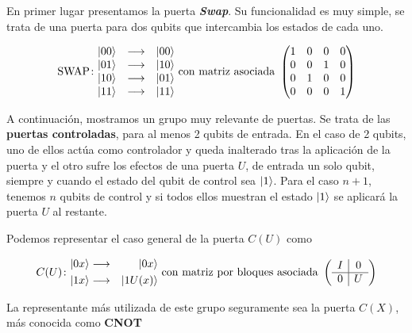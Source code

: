 En primer lugar presentamos la puerta \textbf{\textit{Swap}}. Su funcionalidad es muy simple, se trata de una puerta para dos qubits que intercambia los estados de cada uno.

\[\gatefour{\mathrm{SWAP}}{\ket{00}}{\ket{10}}{\ket{01}}{\ket{11}}\mathrm{\ con\ matriz\ asociada\ }\left(\begin{matrix}1&0&0&0\\0&0&1&0\\0&1&0&0\\0&0&0&1\end{matrix}\right)\]

A continuación, mostramos un grupo muy relevante de puertas. Se trata de las \textbf{puertas controladas}, para al menos 2 qubits de entrada. En el caso de 2 qubits, uno de ellos actúa como controlador y queda inalterado tras la aplicación de la puerta y el otro sufre los efectos de una puerta $U$, de entrada un solo qubit, siempre y cuando el estado del qubit de control sea $\left|1\right\rangle$. Para el caso $n+1$, tenemos $n$ qubits de control y si todos ellos muestran el estado $\left|1\right\rangle$ se aplicará la puerta $U$ al restante.

Podemos representar el caso general de la puerta $C(U)$ como

\[C(U)\colon \begin{aligned}\ket{0x}&\longrightarrow&\ket{0x}\\\ket{1x}&\longrightarrow&\ket{1U(x)}\end{aligned} \mathrm{\ con\ matriz\ por\ bloques\ asociada\ }\left(\begin{array}{c|c}I&0\\\hline0&U\end{array}\right)\]

La representante más utilizada de este grupo seguramente sea la puerta $C(X)$, más conocida como \textbf{CNOT}





